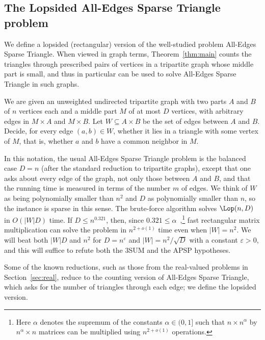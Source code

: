 \subsection{The Lopsided All-Edges Sparse Triangle problem}\label{sec:tri}

We define a lopsided (rectangular) version of the well-studied problem All-Edges Sparse Triangle.
When viewed in graph terms, Theorem~\ref{thm:main} counts the triangles through prescribed pairs of vertices in a tripartite graph whose middle part is small, and thus in particular can be used to solve All-Edges Sparse Triangle in such graphs.


\begin{definition}\label{def:lop}
We are given an unweighted undirected tripartite graph with two parts $A$ and $B$ of $n$ vertices each and a middle part $M$ of at most $D$ vertices, with arbitrary edges in $M\times A$ and $M\times B$. Let $W\subseteq A\times B$ be the set of edges between $A$ and $B$. Decide, for every edge $(a,b)\in W$, whether it lies in a triangle with some vertex of $M$, that is, whether $a$ and $b$ have a common neighbor in $M$.
\end{definition}

In this notation, the usual All-Edges Sparse Triangle problem is the balanced case $D=n$ (after the standard reduction to tripartite graphs), except that one asks about every edge of the graph, not only those between $A$ and $B$, and that the running time is measured in terms of the number $m$ of edges. We think of $W$ as being polynomially smaller than $n^2$ and $D$ as polynomially smaller than $n$, so the instance is sparse in this sense. The brute-force algorithm solves $\Lop(n,D)$ in $O(|W|D)$ time. If $D\leq n^{0.321}$, then, since $0.321\le\alpha$~\cite{VXXZ24},\footnote{Here $\alpha$ denotes the supremum of the constants $\alpha\in(0,1]$ such that $n\times n^\alpha$ by $n^\alpha\times n$ matrices can be multiplied using $n^{2+o(1)}$ operations.} fast rectangular matrix multiplication can solve the problem in $n^{2+o(1)}$ time even when $|W|=n^2$. We will beat both $|W|D$ and $n^2$ for $D=n^{\varepsilon}$ and $|W|=n^2/\sqrt D$ with a constant $\varepsilon>0$, and this will suffice to refute both the $3$SUM and the APSP hypotheses.

Some of the known reductions, such as those from the real-valued problems in Section~\ref{sec:real}, reduce to the counting version of All-Edges Sparse Triangle, which asks for the number of triangles through each edge; we define the lopsided version.


